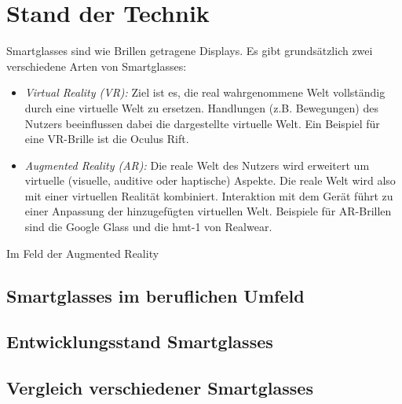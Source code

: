 \chapter{Stand der Technik}
Smartglasses sind wie Brillen getragene Displays. Es gibt grundsätzlich zwei verschiedene Arten von Smartglasses: \cite{Schweizer2014SmartApplications, Ernst2016TheSubstitutability}
\begin{itemize}
    \item[]\emph{Virtual Reality (VR):} 
        Ziel ist es, die real wahrgenommene Welt vollständig durch eine virtuelle Welt zu ersetzen. Handlungen (z.B. Bewegungen) des Nutzers beeinflussen dabei die dargestellte virtuelle Welt. Ein Beispiel für eine VR-Brille ist die Oculus Rift.
    
    \item[] \emph{Augmented Reality (AR):} 
        Die reale Welt des Nutzers wird erweitert um virtuelle (visuelle, auditive oder haptische) Aspekte. Die reale Welt wird also mit einer virtuellen Realität kombiniert. Interaktion mit dem Gerät führt zu einer Anpassung der hinzugefügten virtuellen Welt. Beispiele für  AR-Brillen sind die Google Glass und die hmt-1 von Realwear. 
\end{itemize}

Im Feld der Augmented Reality 


\begin{comment}





\end{comment}
%
%
\section{Smartglasses im beruflichen Umfeld}
%
%
\section{Entwicklungsstand Smartglasses}
%
%
\section{Vergleich verschiedener Smartglasses}
